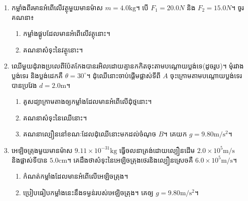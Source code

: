 \begin{exercise}
	\begin{enumerate}
		\item កម្លាំងពីរមានអំពើលើវត្ថុមួយមានម៉ាស $m=4.0\si{\kilogram}$។ បើ $F_{1}=20.0N$ និង $F_{2}=15.0N$។ ចូរគណនា៖
		\begin{enumerate}[k,2]
			\item កម្លាំងផ្គូបដែលមានអំពើលើវត្ថុនោះ។
			\item គណនាសំទុះនៃវត្ថុនោះ។
		\end{enumerate}
		\item ឈើមួយដុំរាងប្រលេពីប៉ែតកែងបានរអិលដោយគ្មានកកិតចុះតាមបណ្តោយប្លង់ទេ(ដូចរូប)។ មុំរវាងប្លង់ទេរ និងប្លង់ដេកគឺ $\theta=30^\circ$។ ដុំឈើនោះចាប់ផ្តើមផ្លាស់ទីពី $A$ ចុះក្រោមតាមបណ្តោយប្លង់ទេរបានប្រវែង $d=2.0\si{\metre}$។
		\begin{enumerate}
			\item គូសដ្យាក្រាមតាងឲ្យកម្លាំងដែលមានអំពើលើដុំថ្មនោះ។
			\item គណនាសំទុះនៃឈើនោះ។
			\item គណនាល្បឿននៅខណៈដែលដុំឈើនោះមកដល់ចំណុច $B$។ គេយក $g=9.80\si{\metre/\second^2}$។
		\end{enumerate}
	\item អេឡិចត្រុងមួយមានម៉ាស $9.11\times10^{-31}\si{\kilogram}$ ធ្វើចលនាត្រង់ដោយល្បឿនដើម $2.0\times10^{5}\si{\metre/\second}$ និងផ្លាស់ទីបាន $5.0\si{\centi\metre}$។ គេដឹងថាសំទុះនៃអេឡិចត្រុងថេរនិងល្បឿនស្រេចគឺ $6.0\times10^{5}\si{\metre/\second}$។
	\begin{enumerate}
		\item កំណត់កម្លាំងដែលមានអំពើលើអេឡិចត្រុង។
		\item ប្រៀបធៀបកម្លាំងនេះនឹងទម្ងន់របស់អេឡិចត្រុង។ គេឲ្យ $g=9.80\si{\metre/\second^{2}}$។
	\end{enumerate}
	\end{enumerate}
	\begin{figure}[H]
		\centering
		\begin{subfigure}[b]{0.3\textwidth}
			\centering
\end{subfigure}
\end{figure}
\end{exercise}
